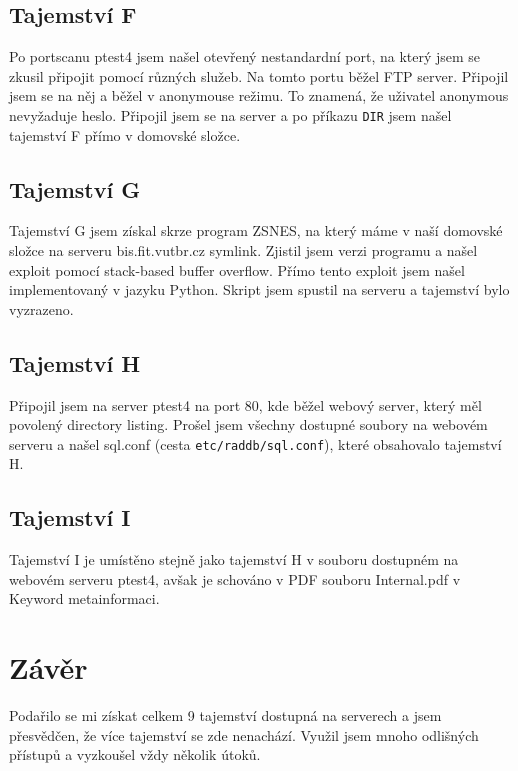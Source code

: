 \documentclass[11pt,a4paper]{article}
\begin{document}
\subsection{Tajemství F}

Po portscanu ptest4 jsem našel otevřený nestandardní port, na který jsem se zkusil připojit pomocí různých služeb. Na tomto portu běžel FTP server. Připojil jsem se na něj a běžel v anonymouse režimu. To znamená, že uživatel anonymous nevyžaduje heslo. Připojil jsem se na server a po příkazu \texttt{DIR} jsem našel tajemství F přímo v domovské složce.

\subsection{Tajemství G}

Tajemství G jsem získal skrze program ZSNES, na který máme v naší domovské složce na serveru bis.fit.vutbr.cz symlink. Zjistil jsem verzi programu a našel exploit pomocí stack-based buffer overflow. Přímo tento exploit jsem našel implementovaný v jazyku Python. Skript jsem spustil na serveru a tajemství bylo vyzrazeno.

\subsection{Tajemství H}

Připojil jsem na server ptest4 na port 80, kde běžel webový server, který měl povolený directory listing. Prošel jsem všechny dostupné soubory na webovém serveru a našel sql.conf (cesta \texttt{etc/raddb/sql.conf}), které obsahovalo tajemství H.

\subsection{Tajemství I}

Tajemství I je umístěno stejně jako tajemství H v souboru dostupném na webovém serveru ptest4, avšak je schováno v PDF souboru Internal.pdf v Keyword metainformaci.


\section{Závěr}

Podařilo se mi získat celkem 9 tajemství dostupná na serverech a jsem přesvědčen, že více tajemství se zde nenachází. Využil jsem mnoho odlišných přístupů a vyzkoušel vždy několik útoků.
\end{document}
